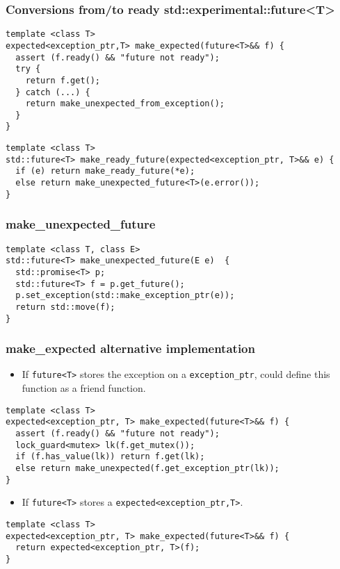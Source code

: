 \documentclass[xcolor=dvipsnames]{beamer}
\newcommand{\cpp}[1]{\lstinline{#1}}
\begin{document}
\begin{frame}[fragile]
\frametitle{Conversions from/to ready std::experimental::future<T> }

\begin{lstlisting}
template <class T>
expected<exception_ptr,T> make_expected(future<T>&& f) {
  assert (f.ready() && "future not ready");
  try {
    return f.get();
  } catch (...) {
    return make_unexpected_from_exception();
  }
}
\end{lstlisting}

\begin{lstlisting}
template <class T>
std::future<T> make_ready_future(expected<exception_ptr, T>&& e) {
  if (e) return make_ready_future(*e);
  else return make_unexpected_future<T>(e.error()); 
}
\end{lstlisting}
\end{frame}

\begin{frame}[fragile]
\frametitle{make\_unexpected\_future }

\begin{lstlisting}
template <class T, class E>
std::future<T> make_unexpected_future(E e)  {
  std::promise<T> p;
  std::future<T> f = p.get_future();
  p.set_exception(std::make_exception_ptr(e));
  return std::move(f);
}
\end{lstlisting}

\end{frame}

\begin{frame}[fragile]
\frametitle{make\_expected alternative implementation }

\begin{itemize}
\item If  \cpp{future<T>} stores the exception on a  \cpp{exception_ptr}, could define this function as a friend function.   
\end{itemize}

\begin{lstlisting}
template <class T>
expected<exception_ptr, T> make_expected(future<T>&& f) {
  assert (f.ready() && "future not ready");
  lock_guard<mutex> lk(f.get_mutex());
  if (f.has_value(lk)) return f.get(lk);
  else return make_unexpected(f.get_exception_ptr(lk));
}
\end{lstlisting}

\begin{itemize}
\item If \cpp{future<T>} stores a \cpp{expected<exception_ptr,T>}.
\end{itemize}

\begin{lstlisting}
template <class T>
expected<exception_ptr, T> make_expected(future<T>&& f) {
  return expected<exception_ptr, T>(f);
}
\end{lstlisting}

\end{frame}
\end{document}
